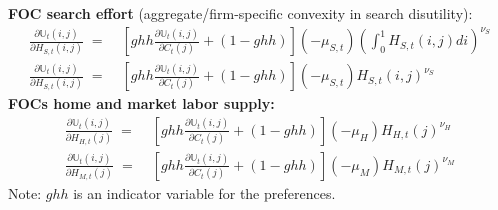 \documentclass[12pt,3p,authoryear,review]{elsarticle}
\begin{document}
\begin{small}
\begin{align}
\begin{split}
	\end{split}%
\end{align}%
\textbf{FOC search effort} (aggregate/firm-specific convexity in search disutility):%
\begin{align}%
	\frac{\partial \mathbb{U}_t(i,j)}{\partial H_{S,t}(i,j)} \; = & \; \left[ ghh \frac{\partial \mathbb{U}_t(i,j)}{\partial C_t(j)}+ \left(1-ghh\right) \right] (-\mu_{S,t}) \left(\int_0^1 H_{S,t}(i,j) di\right)^{\nu_S}\\%
	\frac{\partial \mathbb{U}_t(i,j)}{\partial H_{S,t}(i,j)} \; = & \; \left[ ghh \frac{\partial \mathbb{U}_t(i,j)}{\partial C_t(j)}+ \left(1-ghh\right) \right] (-\mu_{S,t}) H_{S,t}(i,j)^{\nu_S}%
\end{align}%
\textbf{FOCs home and market labor supply:}%
\begin{align}%
	\frac{\partial \mathbb{U}_t(i,j)}{\partial H_{H,t}(j)} \; = & \; \left[ ghh \frac{\partial \mathbb{U}_t(i,j)}{\partial C_t(j)}+ \left(1-ghh\right) \right] (-\mu_H) H_{H,t}(j)^{\nu_H}\\%
	\frac{\partial \mathbb{U}_t(i,j)}{\partial H_{M,t}(j)} \; = & \; \left[ ghh \frac{\partial \mathbb{U}_t(i,j)}{\partial C_t(j)}+ \left(1-ghh\right) \right] (-\mu_M) H_{M,t}(j)^{\nu_M}%
\end{align}%
Note: $ghh$ is an indicator variable for the \cite{greenwoodInvestmentCapacityUtilization1988} preferences.%
\end{small}%
\pagebreak%
\end{document}
